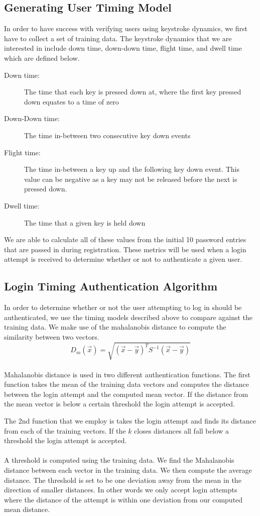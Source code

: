 \documentclass{article}
\begin{document}
\subsection{Generating User Timing Model}
In order to have success with verifying users using keystroke dynamics, we first have to collect a set of training data. The keystroke dynamics that we are interested in include down time, down-down time, flight time, and dwell time which are defined below. 
\begin{description}
	\item[Down time:] The time that each key is pressed down at, where the first key pressed down equates to a time of zero
	\item[Down-Down time:] The time in-between two consecutive key down events
	\item[Flight time:] The time in-between a key up and the following key down event. This value can be negative as a key may not be released before the next is pressed down. 
	\item[Dwell time:] The time that a given key is held down
\end{description}
We are able to calculate all of these values from the initial 10 password entries that are passed in during registration. These metrics will be used when a login attempt is received to determine whether or not to authenticate a given user.

\subsection{Login Timing Authentication Algorithm}
In order to determine whether or not the user attempting to log in should be authenticated, we use the timing models described above to compare against the training data. We make use of the mahalanobis distance to compute the similarity between two vectors.  \\
\begin{displaymath}
D_m(\vec{x}) = \sqrt{(\vec{x}-\vec{y})^T S^{-1} (\vec{x}-\vec{y})}
\end{displaymath} \\
Mahalanobis distance is used in two different authentication functions. The first function takes the mean of the training data vectors and computes the distance between the login attempt and the computed mean vector. If the distance from the mean vector is below a certain threshold the login attempt is accepted. 

The 2nd function that we employ is takes the login attempt and finds its distance from each of the training vectors. If the $k$ closes distances all fall below a threshold the login attempt is accepted. \\ \\
A threshold is computed using the training data. We find the Mahalanobis distance between each vector in the training data. We then compute the average distance. The threshold is set to be one deviation away from the mean in the direction of smaller distances. In other words we only accept login attempts where the distance of the attempt is within one deviation from our computed mean distance. 
\end{document}
